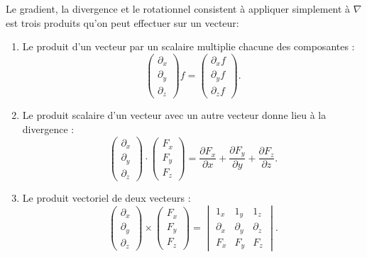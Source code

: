 Le gradient, la divergence et le rotationnel consistent à appliquer simplement à $\nabla$ est trois produits qu'on peut effectuer sur un vecteur:
\begin{enumerate}
    \item
        Le produit d'un vecteur par un scalaire multiplie chacune des composantes :
        \begin{equation}
            \begin{pmatrix}
                \partial_x    \\ 
                \partial_y    \\ 
                \partial_z    
            \end{pmatrix}f
            =\begin{pmatrix}
                \partial_xf    \\ 
                \partial_yf    \\ 
                \partial_zf    
            \end{pmatrix}.
        \end{equation}
    \item
        Le produit scalaire d'un vecteur avec un autre vecteur donne lieu à la divergence :
        \begin{equation}
            \begin{pmatrix}
                \partial_x    \\ 
                \partial_y    \\ 
                \partial_z    
            \end{pmatrix}\cdot
            \begin{pmatrix}
                F_x    \\ 
                F_y    \\ 
                F_z    
            \end{pmatrix}=
            \frac{ \partial F_x }{ \partial x }+\frac{ \partial F_y }{ \partial y }+\frac{ \partial F_z }{ \partial z }.
        \end{equation}
    \item
        Le produit vectoriel de deux vecteurs :
        \begin{equation}
            \begin{pmatrix}
                \partial_x    \\ 
                \partial_y    \\ 
                \partial_z    
            \end{pmatrix}\times\begin{pmatrix}
                F_x    \\ 
                F_y    \\ 
                F_z    
            \end{pmatrix}=
            \begin{vmatrix}
                1_x    &   1_y    &   1_z    \\
                \partial_x    &   \partial_y    &   \partial_z    \\
                F_x    &   F_y    &   F_z
            \end{vmatrix}.
        \end{equation}
\end{enumerate}
